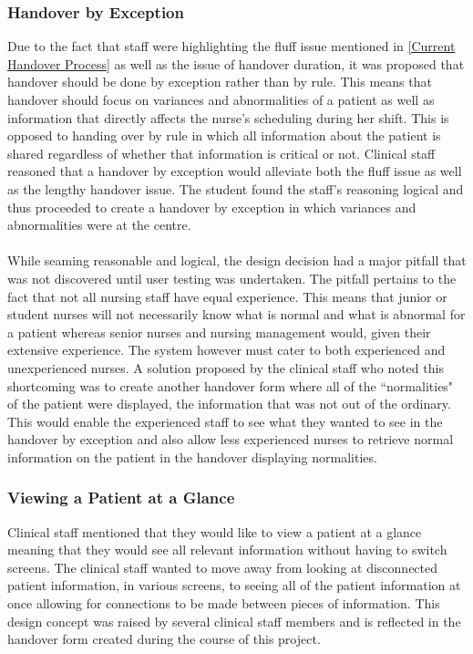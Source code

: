 \subsubsection{Handover by Exception}
Due to the fact that staff were highlighting the fluff issue mentioned in \ref{Current Handover Process} as well as the issue of handover duration, it was proposed that handover should be done by exception rather than by rule. This means that handover should focus on variances and abnormalities of a patient as well as information that directly affects the nurse's scheduling during her shift. This is opposed to handing over by rule in which all information about the patient is shared regardless of whether that information is critical or not. Clinical staff reasoned that a handover by exception would alleviate both the fluff issue as well as the lengthy handover issue. The student found the staff's reasoning logical and thus proceeded to create a handover by exception in which variances and abnormalities were at the centre.
\\ \\
While seaming reasonable and logical, the design decision had a major pitfall that was not discovered until user testing was undertaken. The pitfall pertains to the fact that not all nursing staff have equal experience. This means that junior or student nurses will not necessarily know what is normal and what is abnormal for a patient whereas senior nurses and nursing management would, given their extensive experience. The system however must cater to both experienced and unexperienced nurses. A solution proposed by the clinical staff who noted this shortcoming was to create another handover form where all of the ``normalities" of the patient were displayed, the information that was not out of the ordinary. This would enable the experienced staff to see what they wanted to see in the handover by exception and also allow less experienced nurses to retrieve normal information on the patient in the handover displaying normalities. 

\subsubsection{Viewing a Patient at a Glance}
Clinical staff mentioned that they would like to view a patient at a glance meaning that they would see all relevant information without having to switch screens. The clinical staff wanted to move away from looking at disconnected patient information, in various screens, to seeing all of the patient information at once allowing for connections to be made between pieces of information. This design concept was raised by several clinical staff members and is reflected in the handover form created during the course of this project. 


